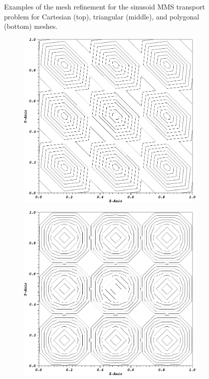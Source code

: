 \begin{figure}
{\begin{subfigure}[b]{0.45\textwidth}
	\end{subfigure}
}
\caption{Examples of the mesh refinement for the sinusoid MMS transport problem for Cartesian (top), triangular (middle), and polygonal (bottom) meshes.}
\label{fig::BF_Results_MMS_Sine_Meshes}
\end{figure}

\begin{figure}
\centering
{
	\begin{subfigure}[b]{0.45\textwidth}
		\centering
		\label{subfig::SineMMS_Cart00_PWL1}
		\includegraphics[width=\textwidth]{figures/sec_BF/MMSSine_PWL1_Cart_cyc00.png}
	\end{subfigure}
	\hfill
	\begin{subfigure}[b]{0.45\textwidth}
		\centering
		\label{subfig::SineMMS_Cart01_PWL1}
		\includegraphics[width=\textwidth]{figures/sec_BF/MMSSine_PWL1_Cart_cyc01.png}

\end{subfigure}}
\end{figure}
